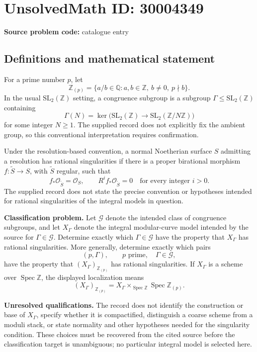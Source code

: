 \documentclass[11pt]{article}
\newcommand{\Z}{\mathbb{Z}}
\newcommand{\Q}{\mathbb{Q}}
\begin{document}
\section*{UnsolvedMath ID: 30004349}
\textbf{Source problem code:} catalogue entry
\subsection{Definitions and mathematical statement}
For a prime number \(p\), let
\[
\Z_{(p)}=\{a/b\in\Q:a,b\in\Z,\ b\ne0,\ p\nmid b\}.
\]
In the usual \(\mathrm{SL}_2(\Z)\) setting, a congruence subgroup is a subgroup \(\Gamma\leq\mathrm{SL}_2(\Z)\) containing
\[
\Gamma(N)=\ker\bigl(\mathrm{SL}_2(\Z)\longrightarrow\mathrm{SL}_2(\Z/N\Z)\bigr)
\]
for some integer \(N\geq1\). The supplied record does not explicitly fix the ambient group, so this conventional interpretation requires confirmation.

Under the resolution-based convention, a normal Noetherian surface \(S\) admitting a resolution has rational singularities if there is a proper birational morphism \(f:\widetilde S\to S\), with \(\widetilde S\) regular, such that
\[
f_*\mathcal O_{\widetilde S}=\mathcal O_S,
\qquad
R^i f_*\mathcal O_{\widetilde S}=0\quad\text{for every integer }i>0.
\]
The supplied record does not state the precise convention or hypotheses intended for rational singularities of the integral models in question.

\textbf{Classification problem.} Let \(\mathcal G\) denote the intended class of congruence subgroups, and let \(X_\Gamma\) denote the integral modular-curve model intended by the source for \(\Gamma\in\mathcal G\). Determine exactly which \(\Gamma\in\mathcal G\) have the property that \(X_\Gamma\) has rational singularities. More generally, determine exactly which pairs
\[
(p,\Gamma),\qquad p\text{ prime},\quad\Gamma\in\mathcal G,
\]
have the property that \((X_\Gamma)_{\Z_{(p)}}\) has rational singularities. If \(X_\Gamma\) is a scheme over \(\operatorname{Spec}\Z\), the displayed localization means
\[
(X_\Gamma)_{\Z_{(p)}}
=X_\Gamma\times_{\operatorname{Spec}\Z}\operatorname{Spec}\Z_{(p)}.
\]

\textbf{Unresolved qualifications.} The record does not identify the construction or base of \(X_\Gamma\), specify whether it is compactified, distinguish a coarse scheme from a moduli stack, or state normality and other hypotheses needed for the singularity condition. These choices must be recovered from the cited source before the classification target is unambiguous; no particular integral model is selected here.
\end{document}
